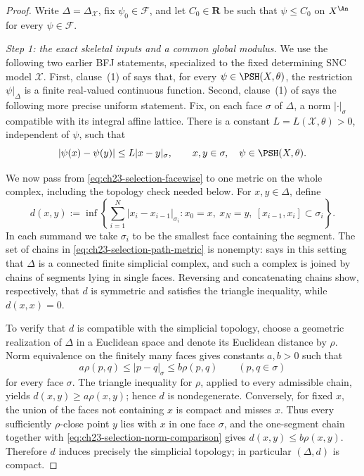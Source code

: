 \begin{proof}
Write \(\Delta=\Delta_{\mathcal X}\), fix \(\psi_0\in\mathcal F\), and let
\(C_0\in\mathbf R\) be such that \(\psi\leq C_0\) on \(X^{\An}\) for every
\(\psi\in\mathcal F\).

\emph{Step 1: the exact skeletal inputs and a common global modulus.}
We use the following two earlier BFJ statements, specialized to the fixed
determining SNC model \(\mathcal X\).  First, clause~(1) of
 says that, for every
\(\psi\in\PSH(X,\theta)\), the restriction \(\psi|_\Delta\) is a finite
real-valued continuous function.  Second, clause~(1) of
 says the following more precise
uniform statement.  Fix, on each face \(\sigma\) of \(\Delta\), a norm
\(|\cdot|_\sigma\) compatible with its integral affine lattice.  There is a
constant \(L=L(\mathcal X,\theta)>0\), independent of \(\psi\), such that
\begin{equation}\label{eq:ch23-selection-facewise}
 |\psi(x)-\psi(y)|\leq L|x-y|_\sigma,
 \qquad x,y\in\sigma,
 \quad \psi\in\PSH(X,\theta).
\end{equation}

We now pass from \eqref{eq:ch23-selection-facewise} to one metric on the
whole complex, including the topology check needed below.  For
\(x,y\in\Delta\), define
\begin{equation}\label{eq:ch23-selection-path-metric}
 d(x,y):=\inf\left\{
   \sum_{i=1}^{N}|x_i-x_{i-1}|_{\sigma_i}:
   x_0=x,\ x_N=y,\ [x_{i-1},x_i]\subset\sigma_i
 \right\}.
\end{equation}
In each summand we take \(\sigma_i\) to be the smallest face containing the
segment.  The set of chains in \eqref{eq:ch23-selection-path-metric} is
nonempty:  says in this setting that
\(\Delta\) is a connected finite simplicial complex, and such a complex is
joined by chains of segments lying in single faces.  Reversing and
concatenating chains show, respectively, that \(d\) is symmetric and
satisfies the triangle inequality, while \(d(x,x)=0\).

To verify that \(d\) is compatible with the simplicial topology, choose a
geometric realization of \(\Delta\) in a Euclidean space and denote its
Euclidean distance by \(\rho\).  Norm equivalence on the finitely many faces
gives constants \(a,b>0\) such that
\begin{equation}\label{eq:ch23-selection-norm-comparison}
 a\rho(p,q)\leq |p-q|_\sigma\leq b\rho(p,q)
 \qquad(p,q\in\sigma)
\end{equation}
for every face \(\sigma\).  The triangle inequality for \(\rho\), applied to
every admissible chain, yields \(d(x,y)\geq a\rho(x,y)\); hence \(d\) is
nondegenerate.  Conversely, for fixed \(x\), the union of the faces not
containing \(x\) is compact and misses \(x\).  Thus every sufficiently
\(\rho\)-close point \(y\) lies with \(x\) in one face \(\sigma\), and the
one-segment chain together with \eqref{eq:ch23-selection-norm-comparison}
gives \(d(x,y)\leq b\rho(x,y)\).  Therefore \(d\) induces precisely the
simplicial topology; in particular \((\Delta,d)\) is compact.


\end{proof}
